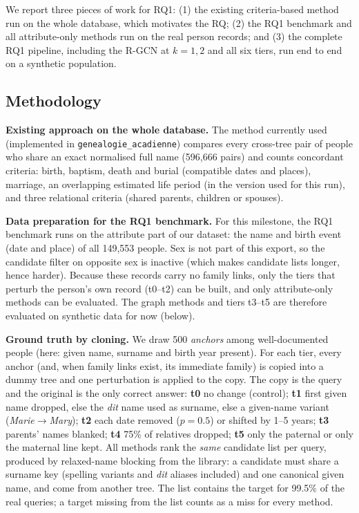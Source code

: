 We report three pieces of work for RQ1: (1) the existing criteria-based method run on the whole database, which motivates the RQ; (2) the RQ1 benchmark and all attribute-only methods run on the real person records; and (3) the complete RQ1 pipeline, including the R-GCN at $k=1,2$ and all six tiers, run end to end on a synthetic population.

\subsection*{Methodology}

\textbf{Existing approach on the whole database.}
The method currently used (implemented in \texttt{genealogie\_acadienne}) compares every cross-tree pair of people who share an exact normalised full name (596{,}666 pairs) and counts concordant criteria: birth, baptism, death and burial (compatible dates and places), marriage, an overlapping estimated life period (in the version used for this run), and three relational criteria (shared parents, children or spouses).

\textbf{Data preparation for the RQ1 benchmark.}
For this milestone, the RQ1 benchmark runs on the attribute part of our dataset: the name and birth event (date and place) of all 149{,}553 people. Sex is not part of this export, so the candidate filter on opposite sex is inactive (which makes candidate lists longer, hence harder). Because these records carry no family links, only the tiers that perturb the person's own record (t0--t2) can be built, and only attribute-only methods can be evaluated. The graph methods and tiers t3--t5 are therefore evaluated on synthetic data for now (below).

\textbf{Ground truth by cloning.}
We draw 500 \emph{anchors} among well-documented people (here: given name, surname and birth year present). For each tier, every anchor (and, when family links exist, its immediate family) is copied into a dummy tree and one perturbation is applied to the copy. The copy is the query and the original is the only correct answer:
\textbf{t0} no change (control);
\textbf{t1} first given name dropped, else the \textit{dit} name used as surname, else a given-name variant (\textit{Marie}$\to$\textit{Mary});
\textbf{t2} each date removed ($p=0.5$) or shifted by 1--5 years;
\textbf{t3} parents' names blanked;
\textbf{t4} 75\% of relatives dropped;
\textbf{t5} only the paternal or only the maternal line kept.
All methods rank the \emph{same} candidate list per query, produced by relaxed-name blocking from the library: a candidate must share a surname key (spelling variants and \textit{dit} aliases included) and one canonical given name, and come from another tree. The list contains the target for 99.5\% of the real queries; a target missing from the list counts as a miss for every method.

